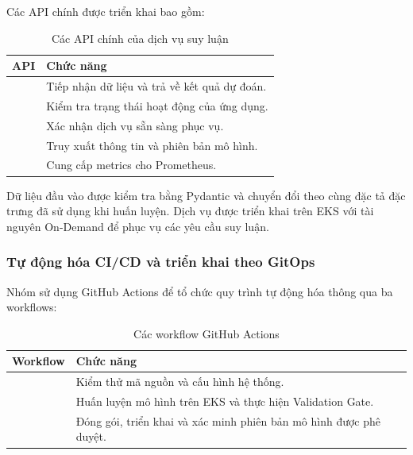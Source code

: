 Các API chính được triển khai bao gồm:


\begin{table}[!htbp]\centering
\fontsize{12}{15}\selectfont{}
\setlength{\tabcolsep}{4pt}\setlength{\arrayrulewidth}{0.4pt}\renewcommand{\arraystretch}{1.2}
\setlength{\ReportTableWidth}{\dimexpr\linewidth-3\arrayrulewidth\relax}
\begin{tabular}{|L{\tabcolsep\relax}|L{\tabcolsep\relax}|}
\hline
\textbf{API} & \textbf{Chức năng} \\
\hline
{} & Tiếp nhận dữ liệu và trả về kết quả dự đoán. \\\hline
{} & Kiểm tra trạng thái hoạt động của ứng dụng. \\\hline
{} & Xác nhận dịch vụ sẵn sàng phục vụ. \\\hline
{} & Truy xuất thông tin và phiên bản mô hình. \\\hline
{} & Cung cấp metrics cho Prometheus. \\\hline
\end{tabular}
\caption{Các API chính của dịch vụ suy luận}\label{tab:09}
\end{table}

Dữ liệu đầu vào được kiểm tra bằng Pydantic và chuyển đổi theo cùng đặc tả đặc trưng đã sử dụng khi huấn luyện. Dịch vụ được triển khai trên EKS với tài nguyên On-Demand để phục vụ các yêu cầu suy luận.


\subsubsection{Tự động hóa CI/CD và triển khai theo GitOps}


Nhóm sử dụng GitHub Actions để tổ chức quy trình tự động hóa thông qua ba workflows:


\begin{table}[!htbp]\centering
\fontsize{12}{15}\selectfont{}
\setlength{\tabcolsep}{4pt}\setlength{\arrayrulewidth}{0.4pt}\renewcommand{\arraystretch}{1.2}
\setlength{\ReportTableWidth}{\dimexpr\linewidth-3\arrayrulewidth\relax}
\begin{tabular}{|L{\tabcolsep\relax}|L{\tabcolsep\relax}|}
\hline
\textbf{Workflow} & \textbf{Chức năng} \\
\hline
{} & Kiểm thử mã nguồn và cấu hình hệ thống. \\\hline
{} & Huấn luyện mô hình trên EKS và thực hiện Validation Gate. \\\hline
{} & Đóng gói, triển khai và xác minh phiên bản mô hình được phê duyệt. \\\hline
\end{tabular}
\caption{Các workflow GitHub Actions}\label{tab:10}
\end{table}

